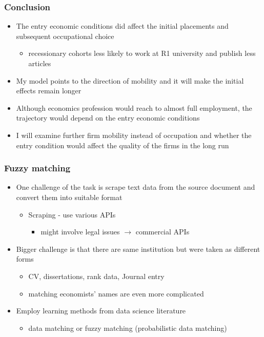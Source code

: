 \documentclass[11pt]{beamer}
\begin{document}
\begin{frame}
	\frametitle{Conclusion}
	\begin{itemize}
		\item The entry economic conditions did affect the initial placements and subsequent occupational choice
		\begin{itemize}
			\item recessionary cohorts less likely to work at R1 university and publish less articles
		\end{itemize}
	\item My model points to the direction of mobility and it will make the initial effects remain longer
	\item Although economics profession would reach to almost full employment, the trajectory would depend on the entry economic conditions
	\item I will examine further firm mobility instead of occupation and whether the entry condition would affect the quality of the firms in the long run
	\end{itemize}
\end{frame}



\begin{frame}[label=appendix]
	\frametitle{Fuzzy matching}
	\begin{itemize}
		\item One challenge of the task is scrape text data from the source document and convert them into suitable format
		\begin{itemize}
			\item Scraping - use various APIs 
			\begin{itemize}
				\item might involve legal issues $\rightarrow$ commercial APIs
			\end{itemize}
		\end{itemize} 
		\item Bigger challenge is that there are same institution but were taken as different forms 
		\begin{itemize}
			\item CV, dissertations, rank data, Journal entry
			\item matching economists' names are even more complicated
		\end{itemize}
			\item Employ learning methods from data science literature
			\begin{itemize}
				\item data matching or fuzzy matching (probabilistic data matching)
			\end{itemize}
	\end{itemize}
\end{frame}
\end{document}
